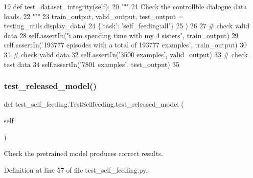 \begin{DoxyCode}
19     \textcolor{keyword}{def }test\_dataset\_integrity(self):
20         \textcolor{stringliteral}{"""}
21 \textcolor{stringliteral}{        Check the controllble dialogue data loads.}
22 \textcolor{stringliteral}{        """}
23         train\_output, valid\_output, test\_output = testing\_utils.display\_data(
24             \{\textcolor{stringliteral}{'task'}: \textcolor{stringliteral}{'self\_feeding:all'}\}
25         )
26 
27         \textcolor{comment}{# check valid data}
28         self.assertIn(\textcolor{stringliteral}{"i am spending time with my 4 sisters"}, train\_output)
29         self.assertIn(\textcolor{stringliteral}{'193777 episodes with a total of 193777 examples'}, train\_output)
30 
31         \textcolor{comment}{# check valid data}
32         self.assertIn(\textcolor{stringliteral}{'3500 examples'}, valid\_output)
33         \textcolor{comment}{# check test data}
34         self.assertIn(\textcolor{stringliteral}{'7801 examples'}, test\_output)
35 
\end{DoxyCode}
\mbox{\label{classtest__self__feeding_1_1TestSelffeeding_ab8bbbada5b5836a100cf30ce3154d666}} 
\subsubsection{\texorpdfstring{test\+\_\+released\+\_\+model()}{test\_released\_model()}}
{\footnotesize\ttfamily def test\+\_\+self\+\_\+feeding.\+Test\+Selffeeding.\+test\+\_\+released\+\_\+model (\begin{DoxyParamCaption}\item[{}]{self }\end{DoxyParamCaption})}

\begin{DoxyVerb}Check the pretrained model produces correct results.
\end{DoxyVerb}
 

Definition at line 57 of file test\+\_\+self\+\_\+feeding.\+py.


